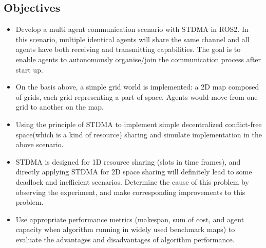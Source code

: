 \documentclass[12pt, oneside]{article}
\begin{document}
\subsection{Objectives}
\label{Objectives}
\begin{itemize}
    \item Develop a multi agent communication scenario with STDMA in ROS2. In this scenario, multiple identical agents will share the same channel and all agents have both receiving and transmitting capabilities. The goal is to enable agents to autonomously organise/join the communication process after start up.
    \item On the basis above, a simple grid world is implemented: a 2D map composed of grids, each grid representing a part of space. Agents would move from one grid to another on the map.
    \item Using the principle of STDMA \cite{STDMA} to implement simple decentralized conflict-free space(which is a kind of resource) sharing and simulate implementation in the above scenario.
    \item STDMA is designed for 1D resource sharing (slots in time frames), and directly applying STDMA for 2D space sharing will definitely lead to some deadlock and inefficient scenarios\cite{MAPF_Deadlock_Explain1,MAPF_Deadlock_Explain2}. Determine the cause of this problem by observing the experiment, and make corresponding improvements to this problem. 
    \item Use appropriate performance metrics (makespan, sum of cost, and agent capacity when algorithm running in widely used benchmark maps\cite{MAPF_Deadlock_Explain2}) to evaluate the advantages and disadvantages of algorithm performance. 
\end{itemize}

\pagebreak
\end{document}

